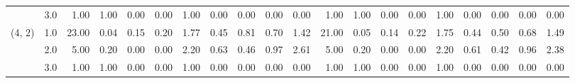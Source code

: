 \begin{tabular}{llrrrrrrrrrrrrrrrrrr}
       & 3.0 &               1.00 &                     1.00 &                                 0.00 &                             0.00 &                           1.00 &                                               0.00 &                                            0.00 &                                            0.00 &                                        0.00 &               1.00 &                     1.00 &                                 0.00 &                             0.00 &                           1.00 &                                               0.00 &                                            0.00 &                                            0.00 &                                        0.00 \\
(4, 2) & 1.0 &              23.00 &                     0.04 &                                 0.15 &                             0.20 &                           1.77 &                                               0.45 &                                            0.81 &                                            0.70 &                                        1.42 &              21.00 &                     0.05 &                                 0.14 &                             0.22 &                           1.75 &                                               0.44 &                                            0.50 &                                            0.68 &                                        1.49 \\
       & 2.0 &               5.00 &                     0.20 &                                 0.00 &                             0.00 &                           2.20 &                                               0.63 &                                            0.46 &                                            0.97 &                                        2.61 &               5.00 &                     0.20 &                                 0.00 &                             0.00 &                           2.20 &                                               0.61 &                                            0.42 &                                            0.96 &                                        2.38 \\
       & 3.0 &               1.00 &                     1.00 &                                 0.00 &                             0.00 &                           1.00 &                                               0.00 &                                            0.00 &                                            0.00 &                                        0.00 &               1.00 &                     1.00 &                                 0.00 &                             0.00 &                           1.00 &                                               0.00 &                                            0.00 &                                            0.00 &                                        0.00 \\

\end{tabular}
